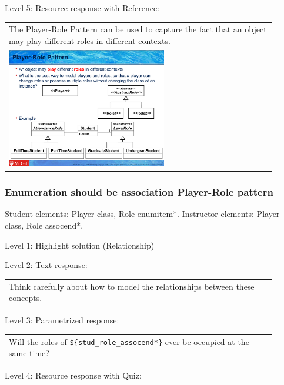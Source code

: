 \noindent Level 5: Resource response with Reference: \medskip

\begin{tabular}{|p{0.9\linewidth}}
The Player-Role Pattern can be used to capture the fact that an object may play different roles
in different contexts.

\\
\includegraphics[width=0.6\textwidth]{images/player_role.png}
\end{tabular} \medskip


\subsubsection{Enumeration should be association Player-Role pattern}

Student elements: Player class, Role enumitem*. Instructor elements: Player class, Role assocend*. \medskip

\noindent Level 1: Highlight solution (Relationship) \medskip

\noindent Level 2: Text response: \medskip

\begin{tabular}{|p{0.9\linewidth}}
Think carefully about how to model the relationships between these concepts.
\end{tabular} \medskip

\noindent Level 3: Parametrized response: \medskip

\begin{tabular}{|p{0.9\linewidth}}
Will the roles of \verb|${stud_role_assocend*}| ever be occupied at the same time?
\end{tabular} \medskip

\noindent Level 4: Resource response with Quiz: \medskip


